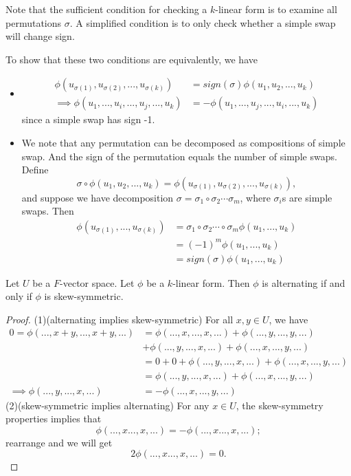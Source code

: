 \begin{refsection}
\begin{remark}
Note that the sufficient condition for checking a $k$-linear form is to examine all permutations $\sigma$. A simplified condition is to only check whether a simple swap will change sign.

To show that these two conditions are equivalently, we have
\begin{itemize}
	\item 
	\begin{align*}
	\phi(u_{\sigma(1)},u_{\sigma(2)},...,u_{\sigma(k)}) &= sign(\sigma)\phi(u_{1},u_{2},...,u_{k}) \\
	\implies \phi(u_1,...,u_i,...,u_j,...,u_k) &= -\phi(u_1,...,u_j,...,u_i,...,u_k)
	\end{align*}
	since a simple swap has sign -1.
	\item We note that any permutation can be decomposed as compositions of simple swap. And the sign of the permutation equals the number of simple swaps. 
	Define
	$$\sigma\circ \phi(u_1,u_2,...,u_k) = \phi(u_{\sigma(1)},u_{\sigma(2)},...,u_{\sigma(k)}),$$
	and suppose we have decomposition $\sigma = \sigma_1\circ \sigma_2 \cdots \sigma_m$, where $\sigma_i$s are simple swaps.
	Then
	\begin{align*}
	\phi(u_{\sigma(1)},...,u_{\sigma(k)}) &= \sigma_1\circ \sigma_2 \cdots \circ\sigma_m \phi(u_1,...,u_k)\\
	& = (-1)^m \phi(u_1,...,u_k) \\
	&= sign(\sigma) \phi(u_1,...,u_k)
	\end{align*}
\end{itemize}
\end{remark}

\begin{lemma}\label{ch:linearalgebra:th:MultilinearFormSkewSymmetricisEquivalenttoAlternating} 
Let $U$ be a $F$-vector space. Let  $\phi$ be a $k$-linear form. Then $\phi$ is alternating if and only if $\phi$ is skew-symmetric.	
\end{lemma}
\begin{proof}
(1)(alternating implies skew-symmetric)
For all $x,y\in U$, we have 
\begin{align*}
0=\phi(...,x+y,...,x+y,...) &= \phi(...,x,...,x,...)+\phi(...,y,...,y,...)\\
&+\phi(...,y,...,x,...)+\phi(...,x,...,y,...) \\
&=0 + 0 + \phi(...,y,...,x,...)+\phi(...,x,...,y,...) \\
&=\phi(...,y,...,x,...)+\phi(...,x,...,y,...) \\
\implies \phi(...,y,...,x,...)&=-\phi(...,x,...,y,...)
\end{align*}
(2)(skew-symmetric implies alternating)
For any $x\in U$, the skew-symmetry properties implies that
$$\phi(...,x...,x,...) = -\phi(...,x...,x,...);$$
rearrange and we will get
$$2\phi(...,x...,x,...) = 0.$$
\end{proof}


\end{refsection}
